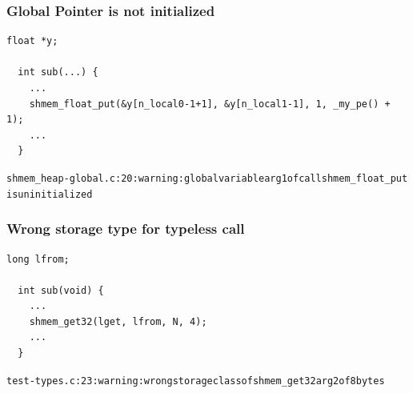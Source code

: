 \vspace{0.2in}

\begin{minipage}{\linewidth}
\subsubsection{Global Pointer is not initialized}

\begin{lstlisting}[language=OSH+C]
  float *y;

  int sub(...) {
    ...
    shmem_float_put(&y[n_local0-1+1], &y[n_local1-1], 1, _my_pe() + 1);
    ...
  }
\end{lstlisting}
\begin{alltt}
  shmem_heap-global.c:20: warning: global variable arg1 of call shmem_float_put
  is uninitialized
\end{alltt}
\end{minipage}

\vspace{0.2in}

\begin{minipage}{\linewidth}
\subsubsection{Wrong storage type for typeless \openshmem call}

\begin{lstlisting}[language=OSH+C]
  long lfrom;

  int sub(void) {
    ...
    shmem_get32(lget, lfrom, N, 4);
    ...
  }
\end{lstlisting}
\begin{alltt}
  test-types.c:23: warning: wrong storage class of shmem_get32 arg2 of 8 bytes
\end{alltt}
\end{minipage}

% 
% 
